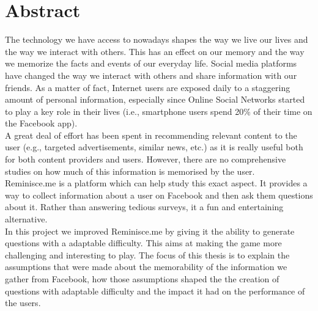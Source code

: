

\cleardoublepage
\chapter*{Abstract}
The technology we have access to nowadays shapes the way we live our lives and the way we interact with others. This has an effect on our memory and the way we memorize the facts and events of our everyday life. Social media platforms have changed the way we interact with others and share information with our friends. As a matter of fact, Internet users are exposed daily to a staggering amount of personal information, especially since Online Social Networks started to play a key role in their lives (i.e., smartphone users spend 20\% of their time on the Facebook app).\\
A great deal of effort has been spent in recommending relevant content to the user (e.g., targeted advertisements, similar news, etc.) as it is really useful both for both content providers and users. However, there are no comprehensive studies on how much of this information is memorised by the user.\\
Reminisce.me is a platform which can help study this exact aspect. It provides a way to collect information about a user on Facebook and then ask them questions about it. Rather than answering tedious surveys, it  a fun and entertaining alternative.\\
In this project we improved Reminisce.me by giving it the ability to generate questions with a adaptable difficulty. This aims at making the game more challenging and interesting to play. The focus of this thesis is to explain the assumptions that were made about the memorability of the information we gather from Facebook, how those assumptions shaped the the creation of questions with adaptable difficulty and the impact it had on the performance of the users.
